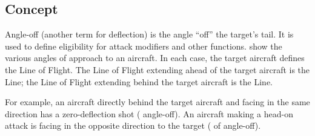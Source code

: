 
\subsection{Concept} Angle-off (another term for deflection) is the angle “off” the target's tail. It is used to define eligibility for attack modifiers and other functions.  show the various angles of approach to an aircraft.  In each case, the target aircraft defines the Line of Flight. The Line of Flight extending ahead of the target aircraft is the  Line; the Line of Flight extending behind the target aircraft is the  Line.

For example, an aircraft directly behind the target aircraft and facing in the same direction has a zero-deflection shot ( angle-off). An aircraft making a head-on attack is facing in the opposite direction to the target ( of angle-off).

